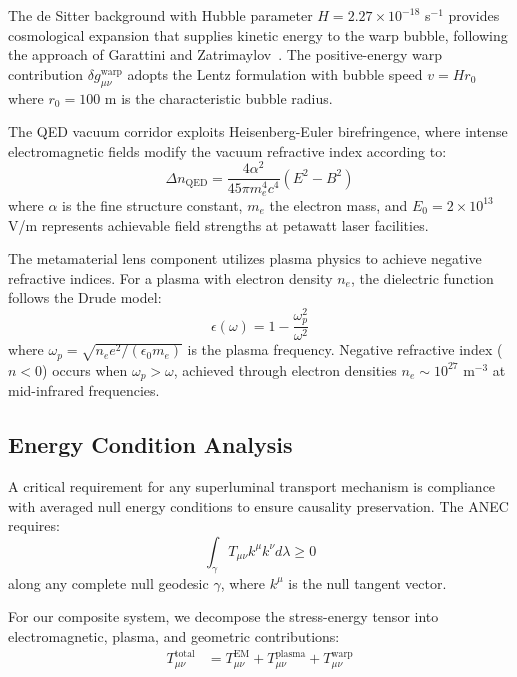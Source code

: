 \documentclass[aps,prl,reprint,groupedaddress]{revtex4-1}
\begin{document}
The de Sitter background with Hubble parameter $H = 2.27 \times 10^{-18}$ s$^{-1}$ provides cosmological expansion that supplies kinetic energy to the warp bubble, following the approach of Garattini and Zatrimaylov~\cite{Garattini2025}. The positive-energy warp contribution $\delta g_{\mu\nu}^{\text{warp}}$ adopts the Lentz formulation with bubble speed $v = Hr_0$ where $r_0 = 100$ m is the characteristic bubble radius.

The QED vacuum corridor exploits Heisenberg-Euler birefringence, where intense electromagnetic fields modify the vacuum refractive index according to:
\begin{equation}
\Delta n_{\text{QED}} = \frac{4\alpha^2}{45\pi m_e^4 c^4}(E^2 - B^2)
\end{equation}
where $\alpha$ is the fine structure constant, $m_e$ the electron mass, and $E_0 = 2 \times 10^{13}$ V/m represents achievable field strengths at petawatt laser facilities.

The metamaterial lens component utilizes plasma physics to achieve negative refractive indices. For a plasma with electron density $n_e$, the dielectric function follows the Drude model:
\begin{equation}
\epsilon(\omega) = 1 - \frac{\omega_p^2}{\omega^2}
\end{equation}
where $\omega_p = \sqrt{n_e e^2/(\epsilon_0 m_e)}$ is the plasma frequency. Negative refractive index ($n < 0$) occurs when $\omega_p > \omega$, achieved through electron densities $n_e \sim 10^{27}$ m$^{-3}$ at mid-infrared frequencies.

\subsection{Energy Condition Analysis}

A critical requirement for any superluminal transport mechanism is compliance with averaged null energy conditions to ensure causality preservation. The ANEC requires:
\begin{equation}
\int_\gamma T_{\mu\nu} k^\mu k^\nu d\lambda \geq 0
\end{equation}
along any complete null geodesic $\gamma$, where $k^\mu$ is the null tangent vector.

For our composite system, we decompose the stress-energy tensor into electromagnetic, plasma, and geometric contributions:
\begin{align}
T_{\mu\nu}^{\text{total}} &= T_{\mu\nu}^{\text{EM}} + T_{\mu\nu}^{\text{plasma}} + T_{\mu\nu}^{\text{warp}}
\end{align}
\end{document}
